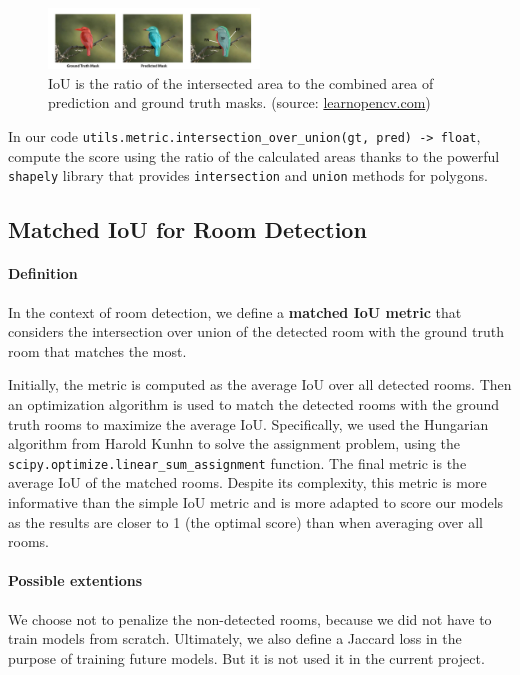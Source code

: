 \documentclass[11pt]{article}
\begin{document}
\begin{figure}[hb!]
    \centering
    \includegraphics[width=0.5\textwidth]{figures/5-segmentation-iou.jpg}
    \caption{IoU is the ratio of the intersected area to the combined area of
     prediction and ground truth masks. 
     (source: \href{https://learnopencv.com/intersection-over-union-iou-in-object-detection-and-segmentation/}
        {learnopencv.com})}
    \label{fig:iou_segmentation}
\end{figure}

In our code \texttt{utils.metric.intersection\_over\_union(gt, pred) -> float},
compute the score using the ratio of the calculated areas thanks to the powerful
\texttt{shapely} library that provides \texttt{intersection} and \texttt{union} 
methods for polygons.

\subsection{Matched IoU for Room Detection}
\paragraph{Definition} In the context of room detection, we define a \textbf{matched IoU
metric} that considers the intersection over union of the detected room with the
ground truth room that matches the most. 

Initially, the metric is computed as the average IoU over all detected rooms.
Then an optimization algorithm is used to match the detected rooms with the ground truth rooms
to maximize the average IoU. Specifically, we used the Hungarian algorithm from 
Harold Kunhn to solve the
assignment problem, using the \texttt{scipy.optimize.linear\_sum\_assignment} function.
The final metric is the average IoU of the matched rooms.
Despite its complexity, this metric is more informative than the simple IoU metric 
and is more adapted to score our models as the results are closer to 1 (the 
optimal score) than when averaging over all rooms.

\paragraph{Possible extentions}
We choose not to penalize the non-detected rooms, because we 
did not have to train models from scratch. Ultimately, we also define a Jaccard 
loss in the purpose of training future models. But it is not used it in the current project.
\end{document}
